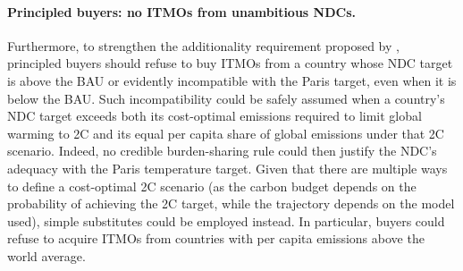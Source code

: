 \documentclass[12pt,english]{article}
\begin{document}
\paragraph{Principled buyers: no ITMOs from unambitious NDCs.} %
Furthermore, to strengthen the additionality requirement proposed by \cite{michaelowa_additionality_2019}, %
principled buyers should refuse to buy ITMOs from a country whose NDC target is above the BAU or evidently incompatible with the Paris target, even when it is below the BAU. 
Such incompatibility could be safely assumed when a country's NDC target exceeds both its cost-optimal emissions required to limit global warming to 2\textdegree{}C and its equal per capita share of global emissions under that 2\textdegree{}C scenario. Indeed, no credible burden-sharing rule could then justify the NDC's adequacy with the Paris temperature target. %
Given that there are multiple ways to define a cost-optimal 2\textdegree{}C scenario (as the carbon budget depends on the probability of achieving the 2\textdegree{}C target, while the trajectory depends on the model used), simple substitutes could be employed instead. In particular, buyers could refuse to acquire ITMOs from countries with per capita emissions %
above the world average. %
\end{document}
